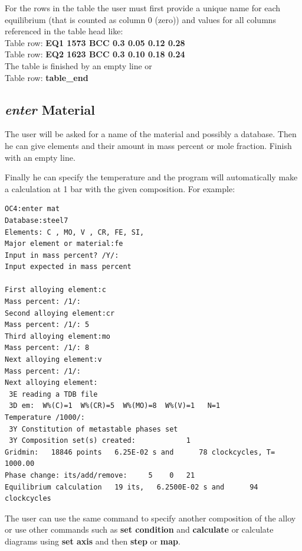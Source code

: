 \documentclass[11pt]{article}
\begin{document}
\hypertarget{Enter table row}{}

For the rows in the table the user must first provide a unique name
for each equilibrium (that is counted as column 0 (zero)) and values
for all columns referenced in the table head like:\\
Table row: {\bf EQ1 1573 BCC 0.3 0.05 0.12 0.28}\\
Table row: {\bf EQ2 1623 BCC 0.3 0.10 0.18 0.24}\\

The table is finished by an empty line or\\
Table row: {\bf table\_end}

\hypertarget{Enter material}{}
\subsection{{\em enter} Material}

The user will be asked for a name of the material and possibly a
database.  Then he can give elements and their amount in mass percent
or mole fraction.  Finish with an empty line.

Finally he can specify the temperature and the program will
automatically make a calculation at 1 bar with the given composition.
For example:

\begin{verbatim}
OC4:enter mat
Database:steel7
Elements: C , MO, V , CR, FE, SI,
Major element or material:fe
Input in mass percent? /Y/:
Input expected in mass percent

First alloying element:c
Mass percent: /1/:
Second alloying element:cr
Mass percent: /1/: 5
Third alloying element:mo
Mass percent: /1/: 8
Next alloying element:v
Mass percent: /1/:
Next alloying element:
 3E reading a TDB file
 3D em:  W%(C)=1  W%(CR)=5  W%(MO)=8  W%(V)=1   N=1
Temperature /1000/:
 3Y Constitution of metastable phases set
 3Y Composition set(s) created:            1
Gridmin:   18846 points   6.25E-02 s and      78 clockcycles, T= 1000.00
Phase change: its/add/remove:     5    0   21
Equilibrium calculation   19 its,   6.2500E-02 s and      94 clockcycles

\end{verbatim}

The user can use the same command to specify another composition of
the alloy or use other commands such as {\bf set condition} and {\bf
  calculate} or calculate diagrams using {\bf set axis} and then {\bf
  step} or {\bf map}.
\end{document}
